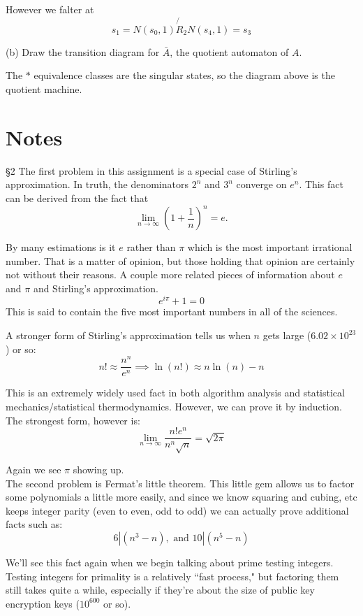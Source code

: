 \documentclass[16 pt]{amsart}
\theoremstyle{definition}
\theoremstyle{remark}
\numberwithin{equation}{subsection}
\begin{document}
However we falter at
\[
s_1 = N(s_0,1) \not{R}_2 N(s_4,1) = s_3
\]

(b) Draw the transition diagram for $\bar{A}$, the quotient automaton of $A$.

The $*$ equivalence classes are the singular states, so the diagram above is the quotient machine.


\newpage

\section{Notes}

\S 2
The first problem in this assignment is a special case of Stirling's approximation.  In truth, the denominators $2^n$ and $3^n$ converge on $e^n$.  This fact can be derived from the fact that
\[
\lim_{n\rightarrow \infty} \left(1 + \frac{1}{n}\right)^n = e.
\]

By many estimations is it $e$ rather than $\pi$ which is the most important irrational number.  That is a matter of opinion, but those holding that opinion are certainly not without their reasons. A couple more related pieces of information about $e$ and $\pi$ and Stirling's approximation.
\[
e^{i\pi}+1 = 0
\]
This is said to contain the five most important numbers in all of the sciences.

A stronger form of Stirling's approximation tells us when $n$ gets large ($6.02\times 10^{23}$) or so:
\[
n! \approx \frac{n^n}{e^n} \implies \ln(n!) \approx n\ln(n)-n
\]

This is an extremely widely used fact in both algorithm analysis and statistical mechanics/statistical thermodynamics.  However, we can prove it by induction.  The strongest form, however is:
\[
\lim_{n\rightarrow\infty} \frac{n!e^n}{n^n\sqrt{n}} =\sqrt{2\pi}
\]

Again we see $\pi$ showing up.\\

The second problem is Fermat's little theorem.  This little gem allows us to factor some polynomials a little more easily, and since we know squaring and cubing, etc keeps integer parity (even to even, odd to odd) we can actually prove additional facts such as:
\[
6|(n^3-n), \text{ and } 10|(n^5-n)
\]

We'll see this fact again when we begin talking about prime testing integers.  Testing integers for primality is a relatively ``fast process," but factoring them still takes quite a while, especially if they're about the size of public key encryption keys ($10^{600}$ or so).
\end{document}
